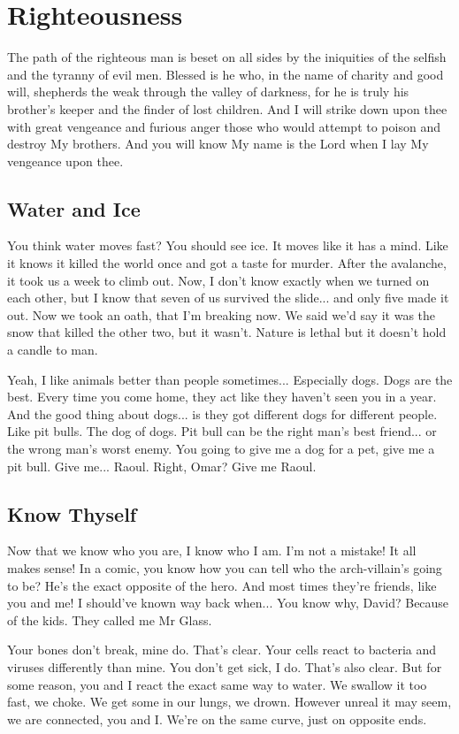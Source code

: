 \documentclass{cs19proc}
\begin{document}
\section{Righteousness}
The path of the righteous man is beset on all sides by the iniquities of the selfish and the tyranny of evil men. Blessed is he who, in the name of charity and good will, shepherds the weak through the valley of darkness, for he is truly his brother's keeper and the finder of lost children. And I will strike down upon thee with great vengeance and furious anger those who would attempt to poison and destroy My brothers. And you will know My name is the Lord when I lay My vengeance upon thee.

\subsection{Water and Ice}
You think water moves fast? You should see ice. It moves like it has a mind. Like it knows it killed the world once and got a taste for murder. After the avalanche, it took us a week to climb out. Now, I don't know exactly when we turned on each other, but I know that seven of us survived the slide... and only five made it out. Now we took an oath, that I'm breaking now. We said we'd say it was the snow that killed the other two, but it wasn't. Nature is lethal but it doesn't hold a candle to man.

Yeah, I like animals better than people sometimes... Especially dogs. Dogs are the best. Every time you come home, they act like they haven't seen you in a year. And the good thing about dogs... is they got different dogs for different people. Like pit bulls. The dog of dogs. Pit bull can be the right man's best friend... or the wrong man's worst enemy. You going to give me a dog for a pet, give me a pit bull. Give me... Raoul. Right, Omar? Give me Raoul.

\subsection{Know Thyself}
Now that we know who you are, I know who I am. I'm not a mistake! It all makes sense! In a comic, you know how you can tell who the arch-villain's going to be? He's the exact opposite of the hero. And most times they're friends, like you and me! I should've known way back when... You know why, David? Because of the kids. They called me Mr Glass.

Your bones don't break, mine do. That's clear. Your cells react to bacteria and viruses differently than mine. You don't get sick, I do. That's also clear. But for some reason, you and I react the exact same way to water. We swallow it too fast, we choke. We get some in our lungs, we drown. However unreal it may seem, we are connected, you and I. We're on the same curve, just on opposite ends.
\end{document}
